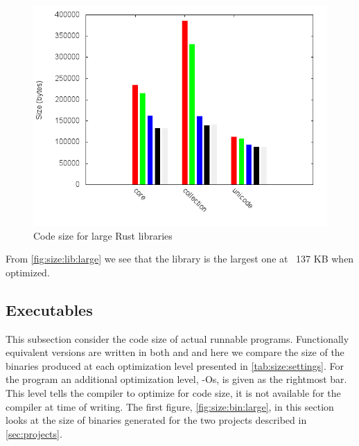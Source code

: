 \begin{figure}[H]
  \begin{center}
    \includegraphics[scale=0.5]{results/plots/size/lib/large/size.png}
  \end{center}
  \caption{Code size for large Rust libraries}
  \label{fig:size:lib:large}
\end{figure}

From \autoref{fig:size:lib:large} we see that the  library is the largest one at ~137 KB when optimized.


\subsection{Executables}

This subsection consider the code size of actual runnable programs.
Functionally equivalent versions are written in both {\rust} and {\C} and here we compare the size of the binaries produced at each optimization level presented in \autoref{tab:size:settings}.
For the {\C} program an additional optimization level, -Os, is given as the rightmost bar.
This level tells the compiler to optimize for code size, it is not available for the {\rust} compiler at time of writing.
The first figure, \autoref{fig:size:bin:large}, in this section looks at the size of binaries generated for the two projects described in \autoref{sec:projects}.

